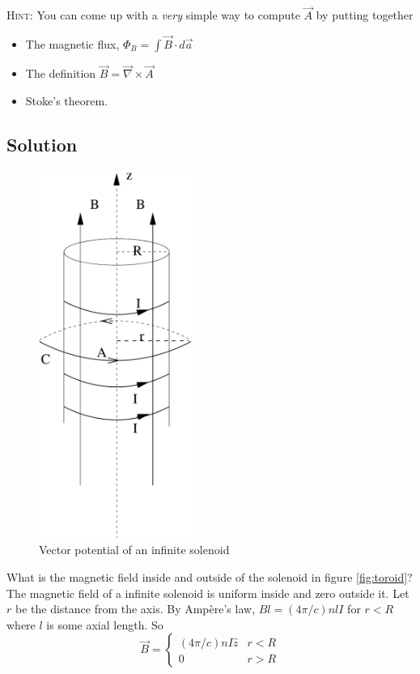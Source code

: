 \documentclass[solutions]{esg8022pset}
\begin{document}
  \noindent \textsc{Hint}: You can come up with a \emph{very} simple way to
  compute $\vec A$ by putting together
  \begin{itemize}
    \item The magnetic flux, $\Phi_B = \int \vec B\cdot d\vec a$
    \item The definition $\vec B = \vec\nabla\times\vec A$
    \item Stoke's theorem.
  \end{itemize}
\subsection{Solution}

  \begin{figure}[H]
    \centering
    \includegraphics[width = 5cm]{vecpot7}
    \caption{Vector potential of an infinite solenoid}
    \label{fig:potential}
  \end{figure}
   What is the magnetic field inside and outside of the solenoid in figure \autoref{fig:toroid}?
  The magnetic field of a infinite solenoid is uniform inside and zero outside
  it.  Let $r$ be the distance from the axis.
  By Amp\`{e}re's law, $Bl=(4\pi/c)nlI$ for $r<R$ where $l$ is some axial
  length.  So
  \begin{equation}
    \vec{B}= \begin{cases} (4\pi/c)nI\hat{z} & r<R\\0 & r>R \end{cases}
  \end{equation}
\end{document}
